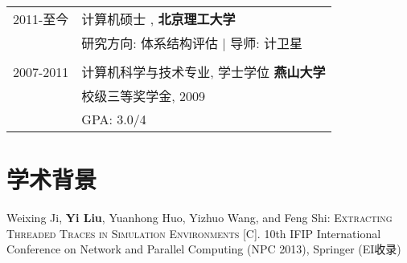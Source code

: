 \documentclass[a4paper,10pt]{article} %
\begin{document}
\begin{tabular}{rl}	

\textsc{2011-至今} & 计算机硕士 , \textbf{北京理工大学} \\
&研究方向: 体系结构评估 | \small 导师: 计卫星\\

&\\


\textsc{2007-2011} & 计算机科学与技术专业, 学士学位 \textbf{燕山大学}\\
& 校级三等奖学金, 2009 \\
& \textsc{GPA}: 3.0/4 \\
\end{tabular}

\section{学术背景}
Weixing Ji, \textbf{Yi Liu}, Yuanhong Huo, Yizhuo Wang, and Feng Shi: \textsc{Extracting Threaded Traces in Simulation Environments [C].}  10th IFIP International Conference on Network and Parallel Computing (NPC 2013), Springer (EI收录)

\nopagebreak
\end{document}
